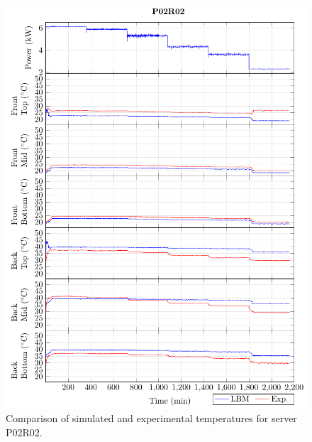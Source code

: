 \documentclass[border=10pt,preview]{standalone}
\begin{document}
\begin{figure}[!htb]
\centering
\includegraphics[width=\linewidth]{Plots/P02R02_T.pdf}
\caption{Comparison of simulated and experimental temperatures for server P02R02.}
\label{fig:P02R02_plot}
\end{figure}

\clearpage
\end{document}
